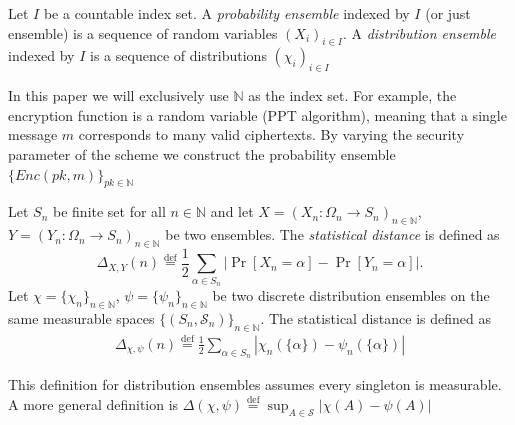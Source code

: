 \begin{definition}[Ensembles] \label{def:prob-ensemble}
    Let $I$ be a countable index set. A \emph{probability ensemble} indexed by $I$ (or just ensemble) is a sequence of random variables $(X_i)_{i \in I}$. A \emph{distribution ensemble} indexed by $I$ is a sequence of distributions $(\chi_i)_{i \in I}$
\end{definition}
In this paper we will exclusively use $\mathbb{N}$ as the index set.
For example, the encryption function is a random variable (PPT algorithm), meaning that a single message $m$ corresponds to many valid ciphertexts. By varying the security parameter of the scheme we construct the probability ensemble $\{Enc(pk,m)\}_{pk \in \mathbb{N}}$
\begin{definition} \label{def:statistical-distance}
    Let $S_n$ be finite set for all $n \in \mathbb{N}$ and let $X = (X_n \colon \Omega_n \to S_n)_{n \in \mathbb{N}}$, $Y = (Y_n \colon \Omega_n \to S_n)_{n \in \mathbb{N}}$ be two ensembles. The \emph{statistical distance} is defined as
    \begin{equation*}
        \Delta_{X,Y}(n) \stackrel{\mathrm{def}}{=} \frac{1}{2} \sum_{\alpha \in S_n} |\operatorname{Pr}[X_n = \alpha] - \operatorname{Pr}[Y_n = \alpha]|.
    \end{equation*}
    Let $\chi = \{\chi_n\}_{n \in \mathbb{N}}$, $\psi = \{\psi_n\}_{n \in \mathbb{N}}$ be two discrete distribution ensembles on the same measurable spaces $\{(S_n, \mathcal{S}_n)\}_{n \in \mathbb{N}}$. The statistical distance is defined as
    \begin{equation*}
    \begin{aligned}
        \Delta_{\chi, \psi}(n) \stackrel{\mathrm{def}}{=} \frac{1}{2} \sum_{\alpha \in S_n} |\chi_n(\{\alpha\}) - \psi_n(\{\alpha\})|
    \end{aligned}
    \end{equation*}
\end{definition}
\begin{remark}
    This definition for distribution ensembles assumes every singleton is measurable. A more general definition is $\Delta(\chi, \psi) \stackrel{\mathrm{def}}{=} \sup _{A \in \mathcal{S}}|\chi(A)-\psi(A)|$ 
\end{remark}

